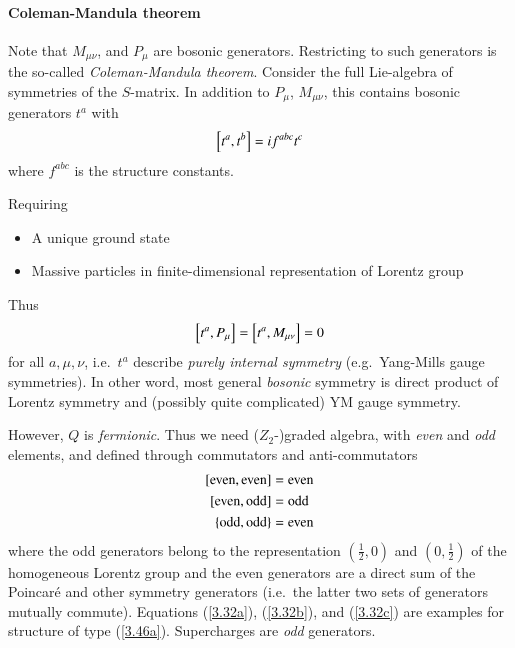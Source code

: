 \paragraph{Coleman-Mandula theorem}
Note that $M_{\mu\nu}$, and $P_\mu$ are bosonic generators. Restricting to such generators is the so-called \textit{Coleman-Mandula theorem}.
Consider the full Lie-algebra of symmetries of the $S$-matrix. In addition to $P_\mu$, $M_{\mu\nu}$, this contains bosonic generators $t^a$ with
\begin{equation}
   \comm{t^a}{t^b} = i f^{abc} t^c \label{3.44}
\end{equation}
where $f^{abc}$ is the structure constants.

Requiring
\begin{itemize}
   \item A unique ground state
   \item Massive particles in finite-dimensional representation of Lorentz group
\end{itemize}
Thus
\begin{equation}
   \comm{t^a}{P_\mu} = \comm{t^a}{M_{\mu\nu}} = 0
\end{equation}
for all $a, \mu, \nu$, i.e.~$t^a$ describe \textit{purely internal symmetry} (e.g.~Yang-Mills gauge symmetries). In other word, most general \textit{bosonic} symmetry is direct product of Lorentz symmetry and (possibly quite complicated) YM gauge symmetry.

However, $Q$ is \textit{fermionic}. Thus we need ($Z_2$-)graded algebra, with \textit{even} and \textit{odd} elements, and defined through commutators and anti-commutators
\begin{subequations}
\begin{align}
   \comm{\text{even}}{\text{even}} &= \text{even} \label{3.46a} \\
   \comm{\text{even}}{\text{odd}} &= \text{odd} \label{3.46b} \\
   \acomm{\text{odd}}{\text{odd}} &= \text{even} \label{3.46c}
\end{align}
\end{subequations}
where the odd generators belong to the representation $(\frac{1}{2}, 0)$ and $(0, \frac{1}{2})$ of the homogeneous Lorentz group and the even generators are a direct sum of the Poincaré and other symmetry generators (i.e.~the latter two sets of generators mutually commute).
Equations (\ref{3.32a}), (\ref{3.32b}), and (\ref{3.32c}) are examples for structure of type (\ref{3.46a}). Supercharges are \textit{odd} generators.


